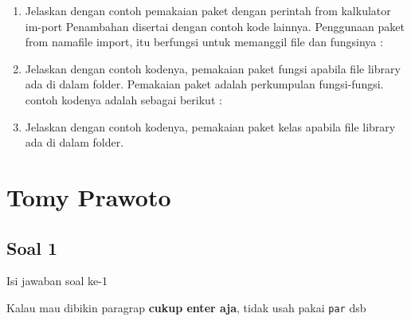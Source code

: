 \begin{enumerate}
\item Jelaskan dengan contoh pemakaian paket dengan perintah from kalkulator im-port Penambahan disertai dengan contoh kode lainnya.
    Penggunaan paket from namafile import, itu berfungsi untuk memanggil file dan fungsinya :
    

\item Jelaskan dengan contoh kodenya, pemakaian paket fungsi apabila file library ada di dalam folder.
    Pemakaian paket adalah perkumpulan fungsi-fungsi. contoh kodenya adalah sebagai berikut :

\item Jelaskan dengan contoh kodenya, pemakaian paket kelas apabila file library ada di dalam folder.
    

\end{enumerate}

\section{Tomy Prawoto}
\subsection{Soal 1}
Isi jawaban soal ke-1

Kalau mau dibikin paragrap \textbf{cukup enter aja}, tidak usah pakai \verb|par| dsb


